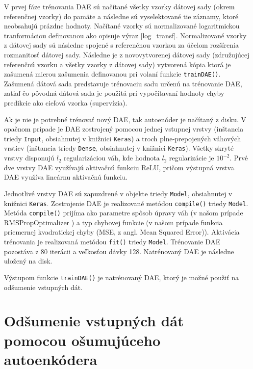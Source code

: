 V prvej fáze trénovania DAE sú načítané všetky vzorky dátovej sady (okrem referenčnej vzorky) do pamäte a následne sú vyselektované tie záznamy, ktoré neobsahujú prázdne hodnoty. Načítané vzorky sú normalizované logaritmickou tranformáciou definovanou ako opisuje výraz \ref{log_transf}. Normalizované vzorky z dátovej sady sú následne spojené s referenčnou vzorkou za účelom rozšírenia rozmanitosť dátovej sady.  Následne je z novovytvorenej dátovej sady (združujúcej referenčnú vzorku a všetky vzorky z dátovej sady) vytvorená kópia ktorá je zašumená mierou zašumenia definovanou pri volaní funkcie \texttt{trainDAE()}. Zašumená dátová sada predstavuje trénovaciu sadu určenú na trénovanie DAE, zatiaľ čo pôvodná dátová sada je použitá pri vypočítavaní hodnoty chyby predikcie ako cieľová vzorka (supervízia).

Ak je nie je potrebné trénovať nový DAE, tak autoenóder je načítaný z disku. V opačnom prípade je DAE zostrojený pomocou jednej vstupnej vrstvy (inštancia triedy \texttt{Input}, obsiahnutej v knižnici \texttt{Keras}) a troch plne-prepojených váhových vrstiev (inštancia triedy \texttt{Dense}, obsiahnutej v knižnici \texttt{Keras}). Všetky skryté vrstvy disponujú $l_2$ regularizáciou váh, kde hodnota $l_2$ regularizácie je $10^{-2}$. Prvé dve vrstvy DAE využívajú aktivačnú funkciu ReLU, pričom výstupná vrstva DAE využíva lineárnu aktivačnú funkciu.

Jednotlivé vrstvy DAE sú zapuzdrené v objekte triedy \texttt{Model}, obsiahnutej v knižnici \texttt{Keras}. Zostrojenie DAE je realizované metódou \texttt{compile()} triedy \texttt{Model}. Metóda \texttt{compile()} prijíma ako parametre spôsob úpravy váh (v našom prípade RMSPropOptimalizer \cite{Goh1995}) a typ chybovej funkcie (v našom prípade funkcia priemernej kvadratickej chyby (MSE, z angl. Mean Squared Error)). Aktivácia trénovania je realizovaná metódou \texttt{fit()} triedy \texttt{Model}. Trénovanie DAE pozostáva z 80 iterácii a veľkosťou dávky 128. Natrénovaný DAE je následne uložený na disk.

Výstupom funkcie \texttt{trainDAE()} je natrénovaný DAE, ktorý je možné použiť na odšumenie vstupných dát.

\section{Odšumenie vstupných dát pomocou ošumujúceho autoenkódera}
\label{predict_DAE}

